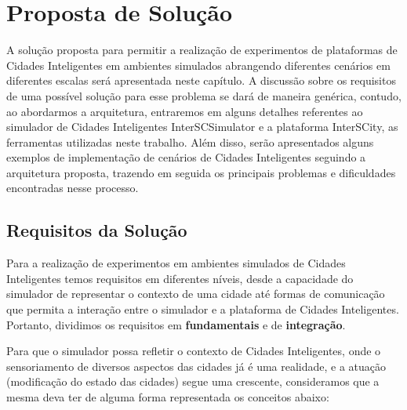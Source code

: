\chapter{Proposta de Solução}
\label{cap:proposta}

A solução proposta para permitir a realização de experimentos de plataformas de Cidades Inteligentes em ambientes simulados abrangendo diferentes cenários em diferentes escalas será
apresentada neste capítulo.
A discussão sobre os requisitos de uma possível solução para esse problema se dará de maneira genérica, contudo, ao abordarmos a arquitetura, entraremos em alguns detalhes referentes ao
simulador de Cidades Inteligentes InterSCSimulator e a plataforma InterSCity, as ferramentas utilizadas neste trabalho.
Além disso, serão apresentados alguns exemplos de implementação de cenários de Cidades Inteligentes seguindo a arquitetura proposta, trazendo em seguida os principais problemas e
dificuldades encontradas nesse processo.

\section{Requisitos da Solução}
\label{sec:requisitos}

Para a realização de experimentos em ambientes simulados de Cidades Inteligentes temos requisitos em diferentes níveis, desde a capacidade do simulador de representar o contexto
de uma cidade até formas de comunicação que permita a interação entre o simulador e a plataforma de Cidades Inteligentes.
Portanto, dividimos os requisitos em \textbf{fundamentais} e de \textbf{integração}.

Para que o simulador possa refletir o contexto de Cidades Inteligentes, onde o sensoriamento de diversos aspectos das cidades já é uma realidade, e a atuação (modificação do estado
das cidades) segue uma crescente, consideramos que a mesma deva ter de alguma forma representada os conceitos abaixo:

